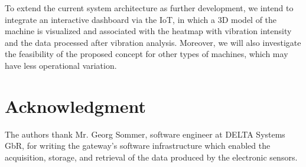 \documentclass[conference]{IEEEtran}
\begin{document}
To extend the current system architecture as further development, we intend to integrate an interactive dashboard via the IoT, in which a 3D model of the machine is visualized and associated with the heatmap with vibration intensity and the data processed after vibration analysis. Moreover, we will also investigate the feasibility of the proposed concept for other types of machines, which may have less operational variation. 
\section*{Acknowledgment}
The authors thank Mr. Georg Sommer, software engineer at DELTA Systems GbR, for writing the gateway's software infrastructure which enabled the acquisition, storage, and retrieval of the data produced by the electronic sensors.

\end{document}
